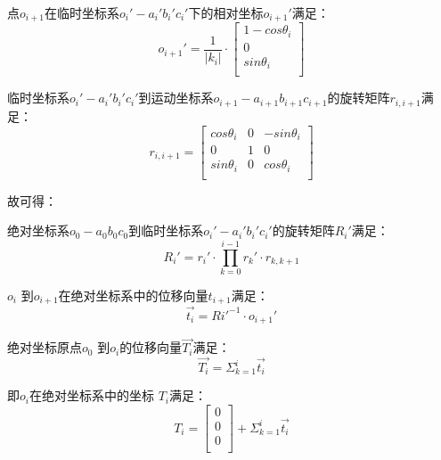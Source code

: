 \begin{itemize}
点$o_{i+1}$在临时坐标系$o_i'-a_i'b_i'c_i'$下的相对坐标$o_{i+1}'$满足：
    \begin{equation}
    o_{i+1}' = \frac{1}{|k_i|} \cdot \left[
      \begin{matrix}
    	1 - cos\theta_i\\
    	0 \\
      sin\theta_i\\
      \end{matrix}
    \right]
    \end{equation}
    
临时坐标系$o_i'-a_i'b_i'c_i'$到运动坐标系$o_{i+1}-a_{i+1}b_{i+1}c_{i+1}$的旋转矩阵$r_{i, i+1}$满足：
    \begin{equation}
    r_{i, i+1} = \left[
      \begin{matrix}
      cos \theta_i & 0 & -sin \theta_i\\
      0 &1 & 0\\
      sin \theta_i & 0 & cos \theta_i\\
      \end{matrix}
    \right]
    \end{equation}

故可得：

绝对坐标系$o_0-a_0b_0c_0$到临时坐标系$o_i'-a_i'b_i'c_i'$的旋转矩阵$R_i'$满足：
    \begin{equation}
    R_i' = r_i' \cdot \prod_{k = 0}^{i-1} r_k' \cdot r_{k, k+1}
    \end{equation}
    
$o_i$ 到$o_{i+1}$在绝对坐标系中的位移向量$t_{i+1}$满足：
    \begin{equation}
    \vec{t_i} = Ri'^{-1}\cdot o_{i+1}'
    \end{equation}

绝对坐标原点$o_0$ 到$o_i$的位移向量$\vec{T_i}$满足：
    \begin{equation}
    \vec{T_i} = \Sigma_{k=1} ^ {i} \vec{t_i}
    \end{equation}

即$o_i$在绝对坐标系中的坐标 $T_i$满足\cite{用于光纤光栅曲线重建算法的坐标点拟合}：
\begin{equation}
T_i = \left[
    \begin{matrix}
    0\\
    0\\
    0\\
  	\end{matrix}
  \right]
  + \Sigma_{k=1} ^ {i} \vec{t_i}
\end{equation}

\end{itemize}

